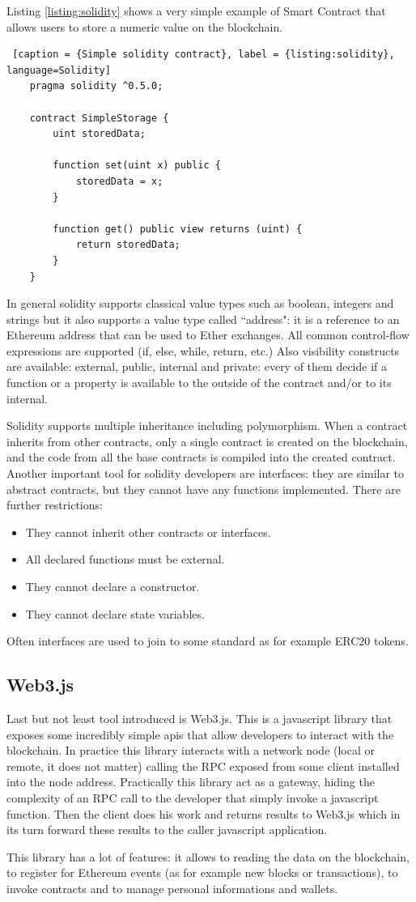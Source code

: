 Listing \ref{listing:solidity} shows a very simple example of Smart Contract that allows users to store a numeric value on 
the blockchain.

\begin{lstlisting} [caption = {Simple solidity contract}, label = {listing:solidity}, language=Solidity]
    pragma solidity ^0.5.0;

    contract SimpleStorage {
        uint storedData;

        function set(uint x) public {
            storedData = x;
        }

        function get() public view returns (uint) {
            return storedData;
        }
    }
\end{lstlisting}

In general solidity supports classical value types such as boolean, integers and strings but it also supports a value type 
called ``address": it is a reference to an Ethereum address that can be used to Ether exchanges. All common  control-flow 
expressions are supported (if, else, while, return, etc.) Also visibility constructs are available: external, public, internal 
and private: every of them decide if a function or a property is available to the outside of the contract and/or to its 
internal.

Solidity supports multiple inheritance including polymorphism. When a contract inherits from other contracts, only a single 
contract is created on the blockchain, and the code from all the base contracts is compiled into the created contract. 
Another important tool for solidity developers are interfaces: they are similar to abstract contracts, but they cannot have 
any functions implemented. There are further restrictions:

\begin{itemize}
    \item They cannot inherit other contracts or interfaces.
    \item All declared functions must be external.
    \item They cannot declare a constructor.
    \item They cannot declare state variables.
\end{itemize}

Often interfaces are used to join to some standard as for example ERC20 tokens.


\subsection{Web3.js}
Last but not least tool introduced is Web3.js. This is a javascript library that exposes some incredibly simple apis that 
allow developers to interact with the blockchain. In practice this library interacts with a network node (local or remote, it 
does not matter) calling the RPC exposed from some client installed into the node address. 
Practically this library act as a gateway, hiding the complexity of an RPC call to the developer that simply invoke a 
javascript function. Then the client does his work and returns results to Web3.js which in its turn forward these results to 
the caller javascript application.

This library has a lot of features: it allows to reading the data on the blockchain, to register for Ethereum events (as for example 
new blocks or transactions), to invoke contracts and to manage personal informations and wallets.